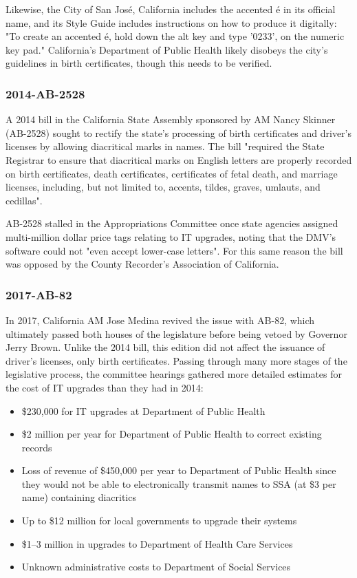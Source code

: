 Likewise, the City of San José, California includes the accented é in its
official name, and its Style Guide includes instructions on how to produce it
digitally: "To create an accented é, hold down the alt key and type '0233'‚ on
the numeric key pad." California's Department of Public Health likely disobeys
the city's guidelines in birth certificates, though this needs to be verified.

\subsubsection{2014-AB-2528}

A 2014 bill in the California State Assembly sponsored by AM Nancy Skinner
(AB-2528) sought to rectify the state's processing of birth certificates and
driver's licenses by allowing diacritical marks in names. The bill "required the
State Registrar to ensure that diacritical marks on English letters are properly
recorded on birth certificates, death certificates, certificates of fetal death,
and marriage licenses, including, but not limited to, accents, tildes, graves,
umlauts, and cedillas". \parencite{ab-2528}

AB-2528 stalled in the Appropriations Committee once state agencies assigned
multi-million dollar price tags relating to IT upgrades, noting that the DMV's
software could not "even accept lower-case letters". For this same reason the
bill was opposed by the County Recorder's Association of California.

\subsubsection{2017-AB-82}

In 2017, California AM Jose Medina revived the issue with AB-82, which
ultimately passed both houses of the legislature before being vetoed by Governor
Jerry Brown. Unlike the 2014 bill, this edition did not affect the issuance of
driver's licenses, only birth certificates. Passing through many more stages of
the legislative process, the committee hearings gathered more detailed estimates
for the cost of IT upgrades than they had in 2014:

\begin{itemize}

\item \$230,000 for IT upgrades at Department of Public Health
\item \$2 million per year for Department of Public Health to correct existing
records
\item Loss of revenue of \$450,000 per year to Department of Public Health since
they would not be able to electronically transmit names to SSA (at \$3 per name)
containing diacritics
\item Up to \$12 million for local governments to upgrade their systems
\item \$1--3 million in upgrades to Department of Health Care Services
\item Unknown administrative costs to Department of Social Services

\end{itemize}

